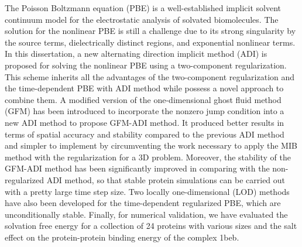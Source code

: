 The Poisson Boltzmann equation (PBE) is a well-established implicit solvent continuum model for the electrostatic analysis of solvated biomolecules. The solution for the nonlinear PBE is still a challenge due to its strong singularity by the source terms, dielectrically distinct regions, and exponential nonlinear terms. In this dissertation, a new alternating direction implicit method (ADI) is proposed for solving the nonlinear PBE using a two-component regularization. This scheme inherits all the advantages of the two-component regularization and the time-dependent PBE with ADI method while possess a novel approach to combine them. A modified version of the one-dimensional ghost fluid method (GFM) has been introduced to incorporate the nonzero jump condition into a new ADI method to propose GFM-ADI method. It produced better results in terms of  spatial accuracy and stability compared to the previous ADI method and simpler to implement by circumventing the work necessary to apply the MIB method with the regularization for a 3D problem. Moreover, the stability of the GFM-ADI method has been significantly improved in comparing with the non-regularized ADI method, so that stable protein simulations can be carried out with a pretty large time step size. Two locally one-dimensional (LOD) methods have also been developed for the time-dependent regularized PBE, which are unconditionally stable.  
Finally, for numerical validation, we have evaluated the solvation free energy for a collection of 24 proteins with various sizes and the salt effect on the protein-protein binding energy of the complex 1beb.